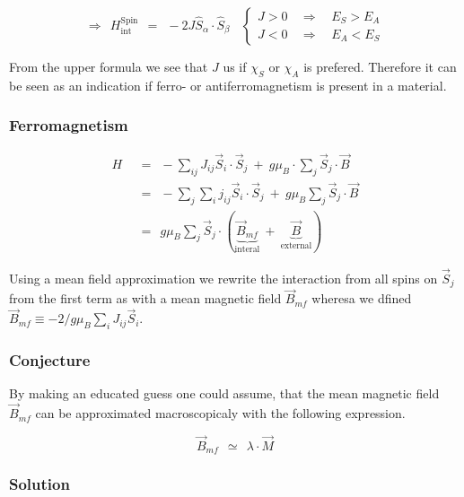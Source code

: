 \documentclass[10pt]{report}
\numberwithin{equation}{chapter}
\begin{document}
\begin{equation}
  \Rightarrow ~~ H^\text{Spin}_\text{int} ~~=~~ - 2J \hat{S}_\alpha \cdot \hat{S}_\beta ~~~~ \left\{
  \begin{array}{lcr}
    J > 0 & ~~ \Rightarrow ~~ & E_S > E_A\\
    J < 0 & ~~ \Rightarrow ~~ & E_A < E_S
  \end{array}\right.
\end{equation}


From the upper formula we see that $J$ us if $\chi_S$ or $\chi_A$ is prefered. Therefore it can be seen as an indication if ferro- or antiferromagnetism is present in a material.


\subsubsection{Ferromagnetism}

\begin{align}
  H ~~& =~~ - \sum_{ij} J_{ij} \vec{S}_i \cdot \vec{S}_j ~+~ g \mu_B \cdot \sum_j \vec{S}_j \cdot \vec{B}\nonumber \\  
      & =~~ - \sum_j \sum_i j_{ij} \vec{S}_i \cdot \vec{S}_j ~+~ g \mu_B \sum_j \vec{S}_j \cdot \vec{B}\nonumber \\
      & =~~ g \mu_B \sum_j \vec{S}_j \cdot ( \underbrace{\vec{B}_{mf}}_\text{interal} ~+~ \underbrace{\vec{B}}_\text{external})
\end{align}

Using a mean field approximation we rewrite the interaction from all spins on $\vec{S}_j$ from the first term as with a mean magnetic field $\vec{B}_{mf}$ wheresa we dfined $\vec{B}_{mf} \equiv -2/g \mu_B \sum_i J_{ij} \vec{S}_i$. 

\subsubsection{Conjecture}

By making an educated guess one could assume, that the mean magnetic field $\vec{B}_{mf}$ can be approximated macroscopicaly with the following expression.

\begin{equation}
  \vec{B}_{mf} ~~≃~~ \lambda \cdot \vec{M}
\end{equation}


\subsubsection{Solution}
\end{document}
